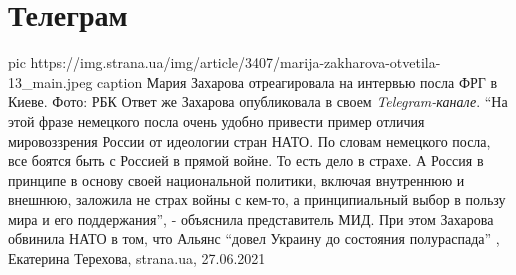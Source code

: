  
 
 
 
 
\chapter{Телеграм}

\ifcmt
  pic https://img.strana.ua/img/article/3407/marija-zakharova-otvetila-13_main.jpeg
  caption Мария Захарова отреагировала на интервью посла ФРГ в Киеве. Фото: РБК 
\fi
Ответ же Захарова опубликовала в своем \emph{Telegram-канале}.  \enquote{На этой фразе
немецкого посла очень удобно привести пример отличия мировоззрения России от
идеологии стран НАТО. По словам немецкого посла, все боятся быть с Россией в
прямой войне. То есть дело в страхе. А Россия в принципе в основу своей
национальной политики, включая внутреннюю и внешнюю, заложила не страх войны с
кем-то, а принципиальный выбор в пользу мира и его поддержания}, - объяснила
представитель МИД.  При этом Захарова обвинила НАТО в том, что Альянс
\enquote{довел Украину до состояния полураспада}
, 
Екатерина Терехова, strana.ua, 27.06.2021

